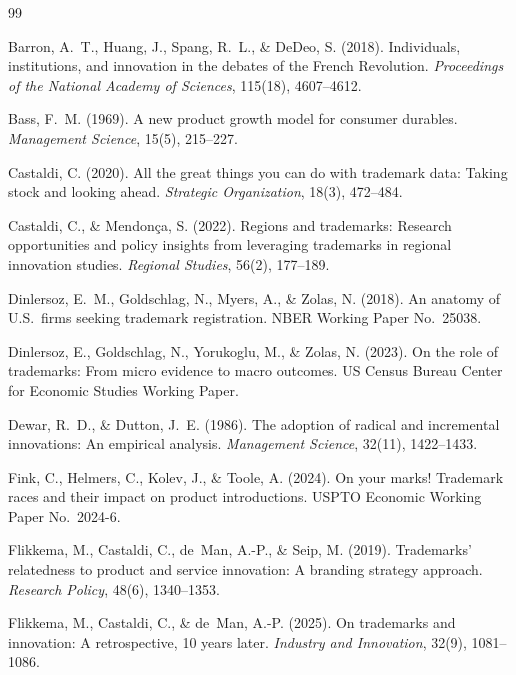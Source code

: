 \documentclass[11pt]{article}
\begin{document}
\begin{thebibliography}{99}

Barron, A.~T., Huang, J., Spang, R.~L., \& DeDeo, S. (2018). Individuals,
institutions, and innovation in the debates of the French Revolution.
\emph{Proceedings of the National Academy of Sciences}, 115(18),
4607--4612.

Bass, F.~M. (1969). A new product growth model for consumer durables.
\emph{Management Science}, 15(5), 215--227.

Castaldi, C. (2020). All the great things you can do with trademark data:
Taking stock and looking ahead. \emph{Strategic Organization}, 18(3),
472--484.

Castaldi, C., \& Mendon\c{c}a, S. (2022). Regions and trademarks: Research
opportunities and policy insights from leveraging trademarks in regional
innovation studies. \emph{Regional Studies}, 56(2), 177--189.

Dinlersoz, E.~M., Goldschlag, N., Myers, A., \& Zolas, N. (2018). An
anatomy of U.S.\ firms seeking trademark registration. NBER Working Paper
No.\ 25038.

Dinlersoz, E., Goldschlag, N., Yorukoglu, M., \& Zolas, N. (2023). On the
role of trademarks: From micro evidence to macro outcomes. US Census
Bureau Center for Economic Studies Working Paper.

Dewar, R.~D., \& Dutton, J.~E. (1986). The adoption of radical and
incremental innovations: An empirical analysis. \emph{Management Science},
32(11), 1422--1433.

Fink, C., Helmers, C., Kolev, J., \& Toole, A. (2024). On your marks!
Trademark races and their impact on product introductions. USPTO Economic
Working Paper No.\ 2024-6.

Flikkema, M., Castaldi, C., de~Man, A.-P., \& Seip, M. (2019). Trademarks'
relatedness to product and service innovation: A branding strategy
approach. \emph{Research Policy}, 48(6), 1340--1353.

Flikkema, M., Castaldi, C., \& de~Man, A.-P. (2025). On trademarks and
innovation: A retrospective, 10 years later. \emph{Industry and
Innovation}, 32(9), 1081--1086.


\end{thebibliography}
\end{document}

